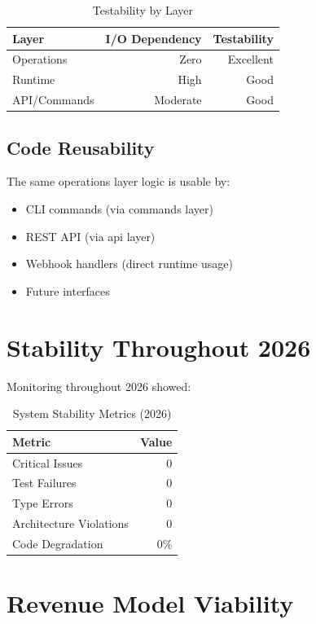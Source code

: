 \documentclass[12pt]{report}
\begin{document}
\begin{table}[h]
\centering
\begin{tabular}{lrr}
\toprule
\textbf{Layer} & \textbf{I/O Dependency} & \textbf{Testability} \\
\midrule
Operations & Zero & Excellent \\
Runtime & High & Good \\
API/Commands & Moderate & Good \\
\bottomrule
\end{tabular}
\caption{Testability by Layer}
\end{table}

\subsection{Code Reusability}

The same operations layer logic is usable by:

\begin{itemize}
    \item CLI commands (via commands layer)
    \item REST API (via api layer)
    \item Webhook handlers (direct runtime usage)
    \item Future interfaces
\end{itemize}

\section{Stability Throughout 2026}

Monitoring throughout 2026 showed:

\begin{table}[h]
\centering
\begin{tabular}{lr}
\toprule
\textbf{Metric} & \textbf{Value} \\
\midrule
Critical Issues & 0 \\
Test Failures & 0 \\
Type Errors & 0 \\
Architecture Violations & 0 \\
Code Degradation & 0\% \\
\bottomrule
\end{tabular}
\caption{System Stability Metrics (2026)}
\end{table}

\section{Revenue Model Viability}
\end{document}
